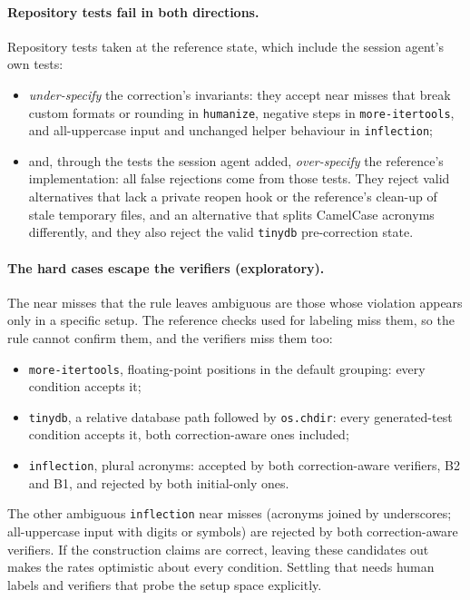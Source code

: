 \paragraph{Repository tests fail in both directions.} Repository tests taken at the reference state, which include the
session agent's own tests:
\begin{itemize}
\item \emph{under-specify} the correction's invariants: they accept near misses that break custom formats or rounding in
  \texttt{humanize}, negative steps in \texttt{more-itertools}, and all-uppercase input and unchanged helper behaviour in
  \texttt{inflection};
\item and, through the tests the session agent added, \emph{over-specify} the reference's implementation: all
   false rejections come from those tests. They reject valid alternatives that lack a private reopen
  hook or the reference's clean-up of stale temporary files, and an alternative that splits CamelCase acronyms differently, and
  they also reject the valid \texttt{tinydb} pre-correction state.
\end{itemize}

\paragraph{The hard cases escape the verifiers (exploratory).} The near misses that the rule leaves ambiguous are those
whose violation appears only in a specific setup. The reference checks used for labeling miss them, so the rule cannot
confirm them, and the verifiers miss them too:
\begin{itemize}
\item \texttt{more-itertools}, floating-point positions in the default grouping: every condition accepts it;
\item \texttt{tinydb}, a relative database path followed by \texttt{os.chdir}: every generated-test condition accepts
  it, both correction-aware ones included;
\item \texttt{inflection}, plural acronyms: accepted by both correction-aware verifiers, B2 and B1, and rejected by both
  initial-only ones.
\end{itemize}
The other ambiguous \texttt{inflection} near misses (acronyms joined by underscores; all-uppercase input with digits or
symbols) are rejected by both correction-aware verifiers. If the construction claims are correct, leaving these
candidates out makes the rates optimistic about every condition. Settling that needs human labels and verifiers that
probe the setup space explicitly.

